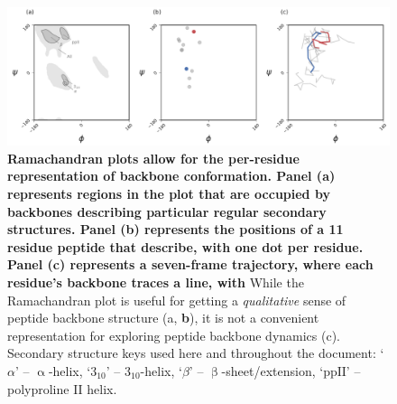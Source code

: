 \documentclass[fleqn,10pt,lineno]{wlpeerj} %
\newcommand{\n}[1]{{\textbf{\color{red}#1}}}
\begin{document}
\begin{figure}[t!]
\begin{adjustwidth}{-1in}{0in} %
\centering
\includegraphics[width=1.0\linewidth]{backmap_fig2.pdf}
\caption{\n{Ramachandran plots allow for the per-residue representation of backbone conformation. Panel (a) represents regions in the plot that are occupied by backbones describing particular regular secondary structures. Panel (b) represents the positions of a 11 residue peptide that describe, with one dot per residue. Panel (c) represents a seven-frame trajectory, where each residue's backbone traces a line, with } While the Ramachandran plot is useful for getting a {\it qualitative} sense of peptide backbone structure (a, \n{b}), it is not a convenient representation for exploring peptide backbone dynamics (c). {\footnotesize Secondary structure keys used here and throughout the document: `$\alpha$' -- $\upalpha$-helix, `$3_{10}$' -- $3_{10}$-helix, `$\beta$' -- $\upbeta$-sheet/extension, `$\textrm{ppII}$' -- polyproline II helix.}\label{fig:ramaintro}} 
\end{adjustwidth}
\end{figure}
\end{document}
